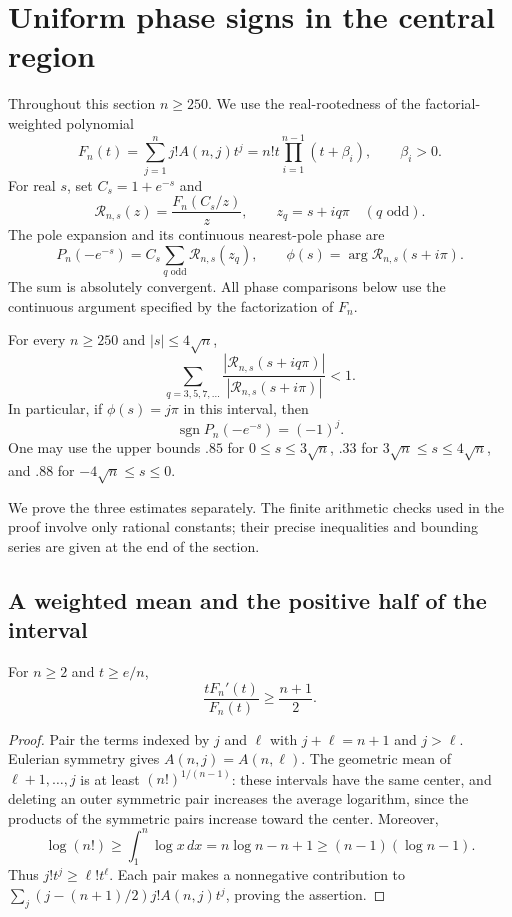 \section{Uniform phase signs in the central region}\label{sec:bulk}

Throughout this section $n\ge250$. We use the real-rootedness of the
factorial-weighted polynomial
\[
 F_n(t)=\sum_{j=1}^n j!A(n,j)t^j
       =n!t\prod_{i=1}^{n-1}(t+\beta_i),\qquad \beta_i>0.
\]
For real $s$, set $C_s=1+e^{-s}$ and
\[
 \mathcal R_{n,s}(z)=\frac{F_n(C_s/z)}z,\qquad
 z_q=s+iq\pi\quad(q\text{ odd}).
\]
The pole expansion and its continuous nearest-pole phase are
\[
 P_n(-e^{-s})=C_s\sum_{q\text{ odd}}\mathcal R_{n,s}(z_q),
 \qquad
 \phi(s)=\arg\mathcal R_{n,s}(s+i\pi).
\]
The sum is absolutely convergent. All phase comparisons below use the
continuous argument specified by the factorization of $F_n$.

\begin{lemma}\label{lem:bulk}
For every $n\ge250$ and $|s|\le4\sqrt n$,
\[
 \sum_{q=3,5,7,\ldots}
 \frac{|\mathcal R_{n,s}(s+iq\pi)|}
      {|\mathcal R_{n,s}(s+i\pi)|}<1.
\]
In particular, if $\phi(s)=j\pi$ in this interval, then
\[
 \operatorname{sgn}P_n(-e^{-s})=(-1)^j.
\]
One may use the upper bounds $.85$ for $0\le s\le3\sqrt n$,
$.33$ for $3\sqrt n\le s\le4\sqrt n$, and $.88$ for
$-4\sqrt n\le s\le0$.
\end{lemma}

We prove the three estimates separately. The finite arithmetic checks
used in the proof involve only rational constants; their precise
inequalities and bounding series are given at the end of the section.

\subsection{A weighted mean and the positive half of the interval}

\begin{lemma}\label{lem:weightedmean}
For $n\ge2$ and $t\ge e/n$,
\[
 \frac{tF_n'(t)}{F_n(t)}\ge\frac{n+1}{2}.
\]
\end{lemma}
\begin{proof}
Pair the terms indexed by $j$ and $\ell$ with $j+\ell=n+1$ and
$j>\ell$. Eulerian symmetry gives $A(n,j)=A(n,\ell)$. The geometric
mean of $\ell+1,\ldots,j$ is at least $(n!)^{1/(n-1)}$: these intervals
have the same center, and deleting an outer symmetric pair increases
the average logarithm, since the products of the symmetric pairs
increase toward the center. Moreover,
\[
 \log(n!)\ge\int_1^n\log x\,dx
 =n\log n-n+1\ge(n-1)(\log n-1).
\]
Thus $j!t^j\ge\ell!t^\ell$. Each pair makes a nonnegative contribution
to $\sum_j(j-(n+1)/2)j!A(n,j)t^j$, proving the assertion.
\end{proof}

